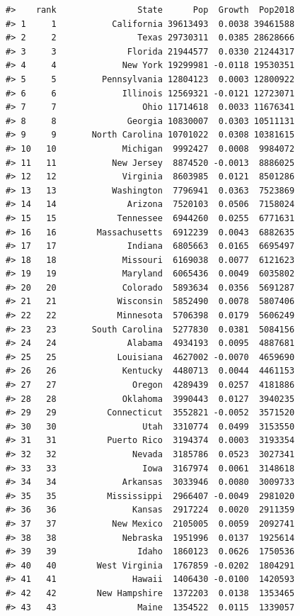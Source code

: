 \documentclass[
]{book}
\begin{document}
\begin{verbatim}
#>    rank                State      Pop  Growth  Pop2018
#> 1     1           California 39613493  0.0038 39461588
#> 2     2                Texas 29730311  0.0385 28628666
#> 3     3              Florida 21944577  0.0330 21244317
#> 4     4             New York 19299981 -0.0118 19530351
#> 5     5         Pennsylvania 12804123  0.0003 12800922
#> 6     6             Illinois 12569321 -0.0121 12723071
#> 7     7                 Ohio 11714618  0.0033 11676341
#> 8     8              Georgia 10830007  0.0303 10511131
#> 9     9       North Carolina 10701022  0.0308 10381615
#> 10   10             Michigan  9992427  0.0008  9984072
#> 11   11           New Jersey  8874520 -0.0013  8886025
#> 12   12             Virginia  8603985  0.0121  8501286
#> 13   13           Washington  7796941  0.0363  7523869
#> 14   14              Arizona  7520103  0.0506  7158024
#> 15   15            Tennessee  6944260  0.0255  6771631
#> 16   16        Massachusetts  6912239  0.0043  6882635
#> 17   17              Indiana  6805663  0.0165  6695497
#> 18   18             Missouri  6169038  0.0077  6121623
#> 19   19             Maryland  6065436  0.0049  6035802
#> 20   20             Colorado  5893634  0.0356  5691287
#> 21   21            Wisconsin  5852490  0.0078  5807406
#> 22   22            Minnesota  5706398  0.0179  5606249
#> 23   23       South Carolina  5277830  0.0381  5084156
#> 24   24              Alabama  4934193  0.0095  4887681
#> 25   25            Louisiana  4627002 -0.0070  4659690
#> 26   26             Kentucky  4480713  0.0044  4461153
#> 27   27               Oregon  4289439  0.0257  4181886
#> 28   28             Oklahoma  3990443  0.0127  3940235
#> 29   29          Connecticut  3552821 -0.0052  3571520
#> 30   30                 Utah  3310774  0.0499  3153550
#> 31   31          Puerto Rico  3194374  0.0003  3193354
#> 32   32               Nevada  3185786  0.0523  3027341
#> 33   33                 Iowa  3167974  0.0061  3148618
#> 34   34             Arkansas  3033946  0.0080  3009733
#> 35   35          Mississippi  2966407 -0.0049  2981020
#> 36   36               Kansas  2917224  0.0020  2911359
#> 37   37           New Mexico  2105005  0.0059  2092741
#> 38   38             Nebraska  1951996  0.0137  1925614
#> 39   39                Idaho  1860123  0.0626  1750536
#> 40   40        West Virginia  1767859 -0.0202  1804291
#> 41   41               Hawaii  1406430 -0.0100  1420593
#> 42   42        New Hampshire  1372203  0.0138  1353465
#> 43   43                Maine  1354522  0.0115  1339057

\end{verbatim}
\end{document}
